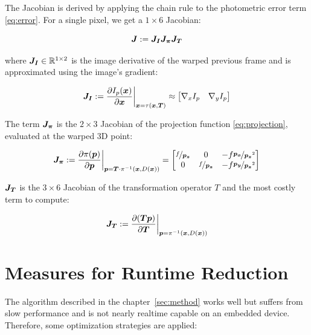 The Jacobian is derived by applying the chain rule to the photometric error term \ref{eq:error}.
For a single pixel, we get a $1 \times 6$ Jacobian:

\begin{equation}
    \mat{J} := \mat{J_I} \mat{J_{\pi}} \mat{J_T}
\end{equation}

where $\mat{J_I} \in \mathbb{R}^{1 \times 2}$ is the image derivative of the warped previous frame and is
approximated using the image's gradient:

\begin{equation}
    \mat{J_I} := \frac{\partial I_p(\vec{x})} {\partial \vec{x}} \bigg|_{\vec{x} = \tau(\vec{x}, \vec{T})}
    \approx
    \begin{bmatrix}
        \nabla{}_x I_p & \nabla{}_y I_p
    \end{bmatrix}
\end{equation}

The term $\mat{J_{\pi}}$ is the $2 \times 3$ Jacobian of the projection
function \ref{eq:projection}, evaluated at the warped 3D point:

\begin{equation}
    \mat{J_{\pi}} := \frac{\partial \pi(\vec{p})}{\partial \vec{p}}
    \bigg|_{\vec{p} = \vec{T}\cdot\pi^{-1}(\vec{x},D(\vec{x}))}
    =
    \begin{bmatrix}
        \nicefrac{f}{\vec{p_z}} & 0 & -f \nicefrac{\vec{p_x}}{\vec{p_z}^2} \\
        0 & \nicefrac{f}{\vec{p_z}} & -f \nicefrac{\vec{p_y}}{\vec{p_z}^2}
    \end{bmatrix}
\end{equation}

$\mat{J_T}$ is the $3 \times 6$ Jacobian of the transformation operator $T$ and
the most costly term to compute:

\begin{equation}
    \mat{J_T} := \frac{\partial (\vec{T} \vec{p})}{\partial \vec{T}}
    \bigg|_{\vec{p} = \pi^{-1}(\vec{x}, D(\vec{x}))}
\end{equation}




\section{Measures for Runtime Reduction}
\label{sec:optimizations}

The algorithm described in the chapter~\ref{sec:method} works well but suffers from
slow performance and is not nearly realtime capable on an embedded device.
Therefore, some optimization strategies are applied:

